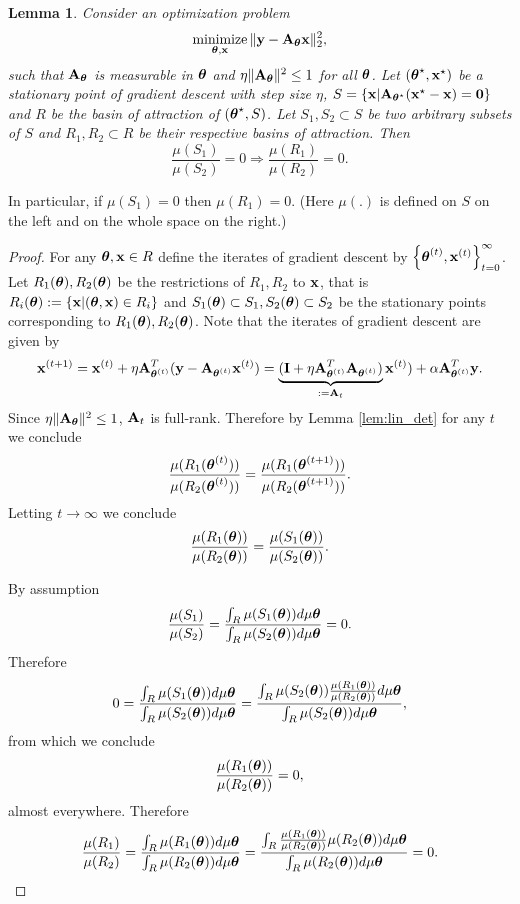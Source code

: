 \documentclass[11pt]{article}
\theoremstyle{plain}
\newtheorem{lemma}{Lemma}
\DeclareMathOperator*{\minimize}{minimize}
\theoremstyle{plain}
\numberwithin{equation}{section}
\numberwithin{lemma}{section}
\numberwithin{theorem}{section}
\numberwithin{corollary}{section}
\numberwithin{observation}{section}
\numberwithin{definition}{section}
\numberwithin{example}{section}
\begin{document}
\begin{lemma}\label{lem:basin} Consider an optimization problem
\begin{equation} \label{eq:theta_x}
    \minimize_{\V{\theta},\V{x}} \| \V{y}-\Mx{A}_{\V{\theta}}\V{x}\|_2^2,
\end{equation}
such that $\Mx{A}_{\V{\theta}}$ is measurable in $\V{\theta}$ and $\eta \|\Mx{A}_{\V{\theta}}\|^2 \leq 1$ for all $\V{\theta}$. Let $(\V{\theta}^\star,\V{x}^\star)$ be a stationary point of gradient descent with step size $\eta$, $S = \{\V{x}|\Mx{A}_{\V{\theta}^\star}(\V{x}^\star-\V{x})=\V{0} \}$ and $R$ be the basin of attraction of $(\V{\theta}^{\star},S)$. Let $S_1, S_2 \subset S$ be two arbitrary subsets of $S$ and $R_1, R_2 \subset R$ be their respective basins of attraction. Then
\[
 \frac{\mu(S_1)}{\mu(S_2)} = 0 \Rightarrow \frac{\mu(R_1)}{\mu(R_2)} = 0.
\]
\end{lemma}
In particular, if $\mu(S_1) = 0$ then $\mu(R_1) = 0$.  (Here $\mu(.)$ is defined on $S$ on the left and on the whole space on the right.)
\begin{proof}
For any $\V{\theta},\V{x} \in R$ define the iterates of gradient descent by $\left\{\V{\theta}^{(t)},\V{x}^{(t)}\right\}_{t = 0}^\infty$. Let $R_1(\V{\theta}),R_2(\V{\theta})$  be the restrictions of $R_1, R_2$ to $\V{x}$, that is $R_i(\V{\theta}) := \{\V{x}|(\V{\theta},\V{x})\in R_i\}$ and $S_1(\V{\theta}) \subset S_1,S_2(\V{\theta})\subset S_2$ be the stationary points corresponding to $R_1(\V{\theta}),R_2(\V{\theta})$.
Note that the iterates of gradient descent are given by 
\[
\V{x}^{(t+1)}=\V{x}^{(t)} + \eta \Mx{A}_{\V{\theta}^{(t)}}^T (\V{y}-\Mx{A}_{\V{\theta}^{(t)}}\V{x}^{(t)})= \underbrace{(\Mx{I}+\eta \Mx{A}_{\V{\theta}^{(t)}}^T \Mx{A}_{\V{\theta}^{(t)}})}_{:=\Mx{A}_t}\V{x}^{(t)})+\alpha \Mx{A}_{\V{\theta}^{(t)}}^T \V{y}.
\]
Since $\eta \|\Mx{A}_{\V{\theta}}\|^2 \leq 1 $, $\Mx{A}_t$ is full-rank. Therefore by Lemma \ref{lem:lin_det} for any $t$ we conclude
\[
\frac{\mu(R_1(\V{\theta}^{(t)}))}{\mu(R_2(\V{\theta}^{(t)}))} = \frac{\mu(R_1(\V{\theta}^{(t+1)}))}{\mu(R_2(\V{\theta}^{(t+1)}))}.
\]
Letting $t \rightarrow \infty$ we conclude
\[
\frac{\mu(R_1(\V{\theta}))}{\mu(R_2(\V{\theta}))} = \frac{\mu(S_1(\V{\theta}))}{\mu(S_2(\V{\theta}))}.
\]

\noindent By assumption 
\[
\frac{\mu(S_1)}{\mu(S_2)} =  \frac{\int_{R} \mu(S_1(\V{\theta})) d\mu\V{\theta}}{\int_{R} \mu(S_2(\V{\theta})) d\mu\V{\theta}}= 0.
\]
Therefore
\[
0 = \frac{\int_{R} \mu(S_1(\V{\theta})) d\mu\V{\theta}}{\int_{R} \mu(S_2(\V{\theta})) d\mu\V{\theta}} = \frac{\int_{R} \mu(S_2(\V{\theta})) \frac{\mu(R_1(\V{\theta}))}{\mu(R_2(\V{\theta}))} d\mu\V{\theta}}{\int_{R} \mu(S_2(\V{\theta})) d\mu\V{\theta}},
\]
from which we conclude 
\[
\frac{\mu(R_1(\V{\theta}))}{\mu(R_2(\V{\theta}))} = 0,
\]
almost everywhere. Therefore
\[
\frac{\mu(R_1)}{\mu(R_2)} =  \frac{\int_{R} \mu(R_1(\V{\theta})) d\mu\V{\theta}}{\int_{R} \mu(R_2(\V{\theta})) d\mu\V{\theta}} = \frac{\int_{R} \frac{\mu(R_1(\V{\theta}))}{\mu(R_2(\V{\theta}))}\mu(R_2(\V{\theta})) d\mu\V{\theta}}{\int_{R} \mu(R_2(\V{\theta})) d\mu\V{\theta}} =0.
\]
\end{proof}
\end{document}
